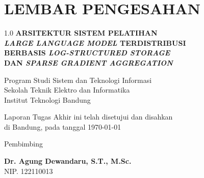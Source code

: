 \chapter*{LEMBAR PENGESAHAN}

\begin{center}
    \vspace{0.5cm}

    \begin{spacing}{1.0}
        \large\bfseries
        ARSITEKTUR SISTEM PELATIHAN\\
        \textit{LARGE LANGUAGE MODEL} TERDISTRIBUSI\\
        BERBASIS \textit{LOG-STRUCTURED STORAGE}\\
        DAN \textit{SPARSE GRADIENT AGGREGATION}
    \end{spacing}

    \vspace{1cm}

    {\large Program Studi Sistem dan Teknologi Informasi}\\%
    {\large Sekolah Teknik Elektro dan Informatika}\\%
    {\large Institut Teknologi Bandung}

    \vspace{0.75cm}

    Laporan Tugas Akhir ini telah disetujui dan disahkan\\
    di Bandung, pada tanggal \today

    \vspace{1.8cm}

    Pembimbing

    \vspace{2.2cm}

    \textbf{Dr. Agung Dewandaru, S.T., M.Sc.}\\[0.1cm]
    NIP. 122110013

\end{center}